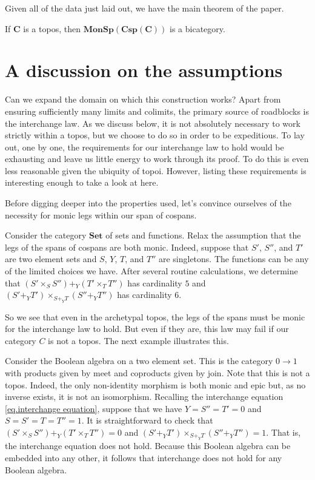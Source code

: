 \documentclass{tac}
\newcommand{\cat}[1]{\mathbf{#1}}
\begin{document}
Given all of the data just laid out, 
we have the main theorem of the paper.

\theorem
	If $\cat{C}$ is a topos, then 
		$ \cat{MonSp ( Csp ( C ) ) } $ is a bicategory.
\endtheorem


\section{A discussion on the assumptions}
\label{sec.Disc on Assump}

Can we expand the domain on which this construction works? 
Apart from ensuring sufficiently many limits and colimits, 
the primary source of roadblocks is the interchange law. 
As we discuss below, it is not absolutely necessary to work 
strictly within a topos, but we choose to do so in order to be expeditious.  
To lay out, one by one, the requirements for our interchange law to hold 
would be exhausting and leave us little energy to work through its proof. 
To do this is even less reasonable given the ubiquity of topoi.   
However, listing these requirements is interesting enough to take a look at here.  

Before digging deeper into the properties used, 
let's convince ourselves of the necessity 
for monic legs within our span of cospans.

\example
	Consider the category $\cat{Set}$ of sets and functions. 
	Relax the assumption that the legs of the 
	spans of cospans are both monic.  Indeed, suppose that 
	$ S' $, $ S'' $, and $ T' $ are two element sets and 
	$ S $, $ Y $, $ T $, and $ T'' $ are singletons.  
	The functions can be any of the limited choices we have.  
	After several routine calculations, we determine that 
		$ ( S' \times_S S'' ) +_Y ( T' \times_T T'' ) $ 
	has cardinality $5$ and 
		$ ( S' +_Y T' ) \times_{ S +_Y T } ( S'' +_Y T'' ) $
	has cardinality $6$. 
\endexample

So we see that even in the archetypal topos, 
the legs of the spans must be monic for the 
interchange law to hold. But even if they are, 
this law may fail if our category $C$ is not a topos. 
The next example illustrates this.

\example
	Consider the Boolean algebra on a two element set.  
	This is the category $0 \to 1$ with products given by 
	meet and coproducts given by join. 
	Note that this is not a topos. 
	Indeed, the only non-identity morphism is both monic and epic 
	but, as no inverse exists, it is not an isomorphism. 
	Recalling the interchange equation 
		\eqref{eq.interchange equation}, 
	suppose that we have 
		$ Y = S'' = T' = 0 $ 
	and 
		$ S = S' = T = T'' = 1 $.  
	It is straightforward to check that 
		$ ( S' \times_S S'' ) +_Y ( T' \times_T T'' ) = 0 $ 
	and 
		$ ( S' +_Y T' ) \times_{ S +_Y T } ( S'' +_Y T'' ) = 1 $. 
	That is, the interchange equation does not hold.  
	Because this Boolean algebra can be embedded into any other, 
	it follows that interchange does not hold for any Boolean algebra.
\endexample
\end{document}
